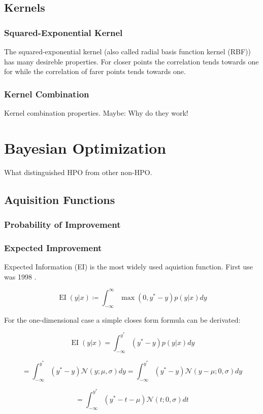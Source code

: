 \documentclass[english]{article}
\newcommand{\EI}{\operatorname{EI}}
\newcommand{\normal}{\mathcal{N}}
\begin{document}
\subsection{Kernels}

\subsubsection{Squared-Exponential Kernel}
The squared-exponential kernel (also called radial basis function kernel (RBF)) has many desireble properties. For closer points the correlation tends towards one for while the correlation of farer points tends towards one.

\subsubsection{Kernel Combination}
Kernel combination properties. Maybe: Why do they work!

\section{Bayesian Optimization}
What distinguished \ac{HPO} from other non-\ac{HPO}.

\subsection{Aquisition Functions}

\subsubsection{Probability of Improvement}
\subsubsection{Expected Improvement}

Expected Information (EI) is the most widely used aquistion function. First use was 1998 \cite{jones_efficient_1998}.

$$ \EI(y|x) \coloneqq \int_{-\infty}^{\infty} \max(0, y^*-y)p(y|x)dy $$

For the one-dimensional case a simple closes form formula can be derivated:

$$ \EI(y|x) = \int_{-\infty}^{y^*}(y^*-y)p(y|x)dy$$

$$ = \int_{-\infty}^{y^*}(y^*-y)\normal(y; \mu, \sigma)dy =
\int_{-\infty}^{y^*}(y^*-y)\normal(y-\mu; 0, \sigma)dy$$

$$ = \int_{-\infty}^{y^*}(y^*- t - \mu)\normal(t; 0, \sigma)dt $$
\end{document}
